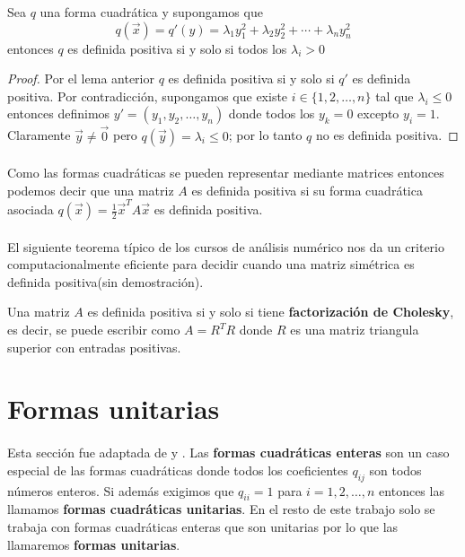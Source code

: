 \begin{theorem}
Sea $q$ una forma cuadrática y supongamos que 
\begin{equation*}
q \left(\overrightarrow{x}\right) = q'(y) = \lambda_{1}y_{1}^{2} + \lambda_{2}y_{2}^{2} + \cdots + \lambda_{n}y_{n}^{2}
\end{equation*}
entonces $q$ es definida positiva si y solo si todos los $\lambda_{i} > 0$
\label{teorema:1.4}
\end{theorem}

\begin{proof}
Por el lema anterior $q$ es definida positiva si y solo si $q'$ es definida positiva. Por contradicción, supongamos que existe $i \in \{1, 2, \ldots, n\}$ tal que $\lambda_{i} \leq 0$ entonces definimos $y' = (y_{1}, y_{2}, \ldots, y_{n})$ donde todos los $y_{k}=0$ excepto $y_{i} = 1$. Claramente $\overrightarrow{y} \neq \overrightarrow{0}$ pero $q(\overrightarrow{y}) = \lambda_{i} \leq 0$; por lo tanto $q$ no es definida positiva.
\end{proof}

\paragraph{}
Como las formas cuadráticas se pueden representar mediante matrices entonces podemos decir que una matriz $A$ es definida positiva si su forma cuadrática asociada $q(\overrightarrow{x}) = \frac{1}{2}\overrightarrow{x}^{T}A\overrightarrow{x}$ es definida positiva.

\paragraph{}
El siguiente teorema típico de los cursos de análisis numérico nos da un criterio computacionalmente eficiente para decidir cuando una matriz simétrica es definida positiva(sin demostración).

\begin{theorem}
Una matriz $A$ es definida positiva si y solo si tiene \textbf{factorización de Cholesky}, es decir, se puede escribir como $A=R^{T}R$ donde $R$ es una matriz triangula superior con entradas positivas.
\label{teorema:1.5}
\end{theorem}

\section{Formas unitarias}
\paragraph*{}
Esta sección fue adaptada de \citep{Ringel1985TameAA} y \citep{alma991031505829703276}. Las \textbf{formas cuadráticas enteras} son un caso especial de las formas cuadráticas donde todos los coeficientes $q_{ij}$ son todos números enteros. Si además exigimos que $q_{ii} = 1$ para $i = 1, 2, \ldots, n$ entonces las llamamos \textbf{formas cuadráticas unitarias}. En el resto de este trabajo solo se trabaja con formas cuadráticas enteras que son unitarias por lo que  las llamaremos \textbf{formas unitarias}.

